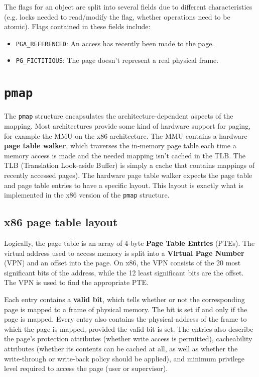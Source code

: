 \documentclass[shortabstract, english]{iithesis}
\begin{document}
The flags for an object are split into several fields due to different
characteristics (e.g. locks needed to read/modify the flag, whether operations
need to be atomic). Flags contained in these fields include:

\begin{itemize}
  \item \texttt{PGA_REFERENCED}: An access has recently been made to the page.
  \item \texttt{PG_FICTITIOUS}: The page doesn't represent a real physical frame.
\end{itemize}


\section{\texttt{pmap}}

The \texttt{pmap} structure encapsulates the architecture-dependent
aspects of the mapping. Most architectures provide some kind of hardware support
for paging, for example the MMU on the x86 architecture. The MMU contains a
hardware \textbf{page table walker}, which traverses the in-memory page table
each time a memory access is made and the needed mapping isn't cached in the
TLB. The TLB (Translation Look-aside Buffer) is simply a cache that contains
mappings of recently accessed pages). The hardware page table walker expects the
page table and page table entries to have a specific layout. This layout is
exactly what is implemented in the x86 version of the \texttt{pmap}
structure.

\subsection{x86 page table layout}

Logically, the page table is an array of 4-byte \textbf{Page Table Entries}
(PTEs). The virtual address used to access memory is split into a
\textbf{Virtual Page Number} (VPN) and an offset into the page. On x86, the VPN
consists of the 20 most significant bits of the address, while the 12 least
significant bits are the offset. The VPN is used to find the appropriate PTE.

Each entry contains a \textbf{valid bit}, which tells whether or not the
corresponding page is mapped to a frame of physical memory. The bit is set if
and only if the page is mapped. Every entry also contains the physical address
of the frame to which the page is mapped, provided the valid bit is set. The
entries also describe the page's protection attributes (whether write access is
permitted), cacheability attributes (whether its contents can be cached at all,
as well as whether the write-through or write-back policy should be applied),
and minimum privilege level required to access the page (user or supervisor).
\end{document}
